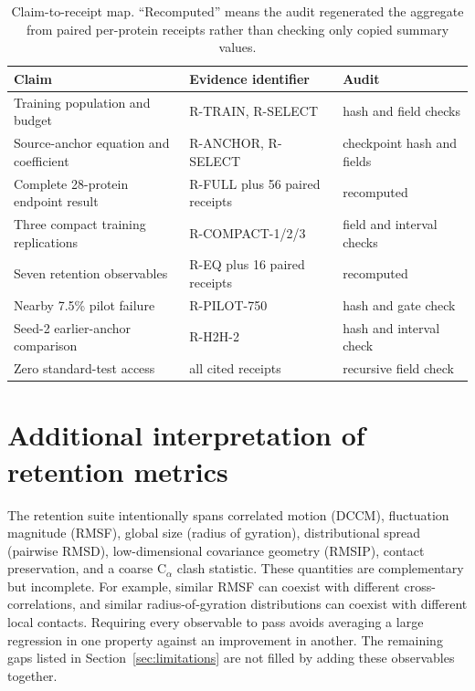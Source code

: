 \documentclass{article}
\newcommand{\CA}{C$_\alpha$}
\begin{document}
\begin{table}[h]
  \caption{Claim-to-receipt map. ``Recomputed'' means the audit regenerated the aggregate from paired per-protein receipts rather than checking only copied summary values.}
  \label{tab:traceability}
  \centering
  \small
  \begin{tabular}{lll}
    \toprule
    Claim & Evidence identifier & Audit \\
    \midrule
    Training population and budget          & R-TRAIN, R-SELECT              & hash and field checks \\
    Source-anchor equation and coefficient  & R-ANCHOR, R-SELECT             & checkpoint hash and fields \\
    Complete 28-protein endpoint result     & R-FULL plus 56 paired receipts & recomputed \\
    Three compact training replications     & R-COMPACT-1/2/3                & field and interval checks \\
    Seven retention observables             & R-EQ plus 16 paired receipts   & recomputed \\
    Nearby 7.5\% pilot failure              & R-PILOT-750                    & hash and gate check \\
    Seed-2 earlier-anchor comparison        & R-H2H-2                        & hash and interval check \\
    Zero standard-test access               & all cited receipts             & recursive field check \\
    \bottomrule
  \end{tabular}
\end{table}

\section{Additional interpretation of retention metrics}

The retention suite intentionally spans correlated motion (DCCM), fluctuation magnitude (RMSF), global size (radius of gyration), distributional spread (pairwise RMSD), low-dimensional covariance geometry (RMSIP), contact preservation, and a coarse \CA{} clash statistic. These quantities are complementary but incomplete. For example, similar RMSF can coexist with different cross-correlations, and similar radius-of-gyration distributions can coexist with different local contacts. Requiring every observable to pass avoids averaging a large regression in one property against an improvement in another. The remaining gaps listed in Section~\ref{sec:limitations} are not filled by adding these observables together.
\end{document}
